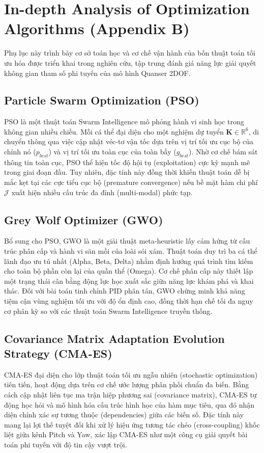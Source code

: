 \documentclass[conference, a4paper]{IEEEtran}
\begin{document}
\section{In-depth Analysis of Optimization Algorithms (Appendix B)}
Phụ lục này trình bày cơ sở toán học và cơ chế vận hành của bốn thuật toán tối ưu hóa được triển khai trong nghiên cứu, tập trung đánh giá năng lực giải quyết không gian tham số phi tuyến của mô hình Quanser 2DOF.

\subsection{Particle Swarm Optimization (PSO)}
PSO là một thuật toán Swarm Intelligence mô phỏng hành vi sinh học trong không gian nhiều chiều. Mỗi cá thể đại diện cho một nghiệm dự tuyển $\boldsymbol{K} \in \mathbb{R}^6$, di chuyển thông qua việc cập nhật véc-tơ vận tốc dựa trên vị trí tối ưu cục bộ của chính nó ($p_{best}$) và vị trí tối ưu toàn cục của toàn bầy ($g_{best}$). Nhờ cơ chế bám sát thông tin toàn cục, PSO thể hiện tốc độ hội tụ (exploitation) cực kỳ mạnh mẽ trong giai đoạn đầu. Tuy nhiên, đặc tính này đồng thời khiến thuật toán dễ bị mắc kẹt tại các cực tiểu cục bộ (premature convergence) nếu bề mặt hàm chi phí $\mathcal{J}$ xuất hiện nhiều cấu trúc đa đỉnh (multi-modal) phức tạp.

\subsection{Grey Wolf Optimizer (GWO)}
Bổ sung cho PSO, GWO là một giải thuật meta-heuristic lấy cảm hứng từ cấu trúc phân cấp và hành vi săn mồi của loài sói xám. Thuật toán duy trì ba cá thể lãnh đạo ưu tú nhất (Alpha, Beta, Delta) nhằm định hướng quá trình tìm kiếm cho toàn bộ phần còn lại của quần thể (Omega). Cơ chế phân cấp này thiết lập một trạng thái cân bằng động lực học xuất sắc giữa năng lực khám phá và khai thác. Đối với bài toán tinh chỉnh PID phân tán, GWO chứng minh khả năng tiệm cận vùng nghiệm tối ưu với độ ổn định cao, đồng thời hạn chế tối đa nguy cơ phân kỳ so với các thuật toán Swarm Intelligence truyền thống.

\subsection{Covariance Matrix Adaptation Evolution Strategy (CMA-ES)}
CMA-ES đại diện cho lớp thuật toán tối ưu ngẫu nhiên (stochastic optimization) tiên tiến, hoạt động dựa trên cơ chế ước lượng phân phối chuẩn đa biến. Bằng cách cập nhật liên tục ma trận hiệp phương sai (covariance matrix), CMA-ES tự động học hỏi và mô hình hóa cấu trúc hình học của hàm mục tiêu, qua đó nhận diện chính xác sự tương thuộc (dependencies) giữa các biến số. Đặc tính này mang lại lợi thế tuyệt đối khi xử lý hiệu ứng tương tác chéo (cross-coupling) khốc liệt giữa kênh Pitch và Yaw, xác lập CMA-ES như một công cụ giải quyết bài toán phi tuyến với độ tin cậy vượt trội.
\end{document}
